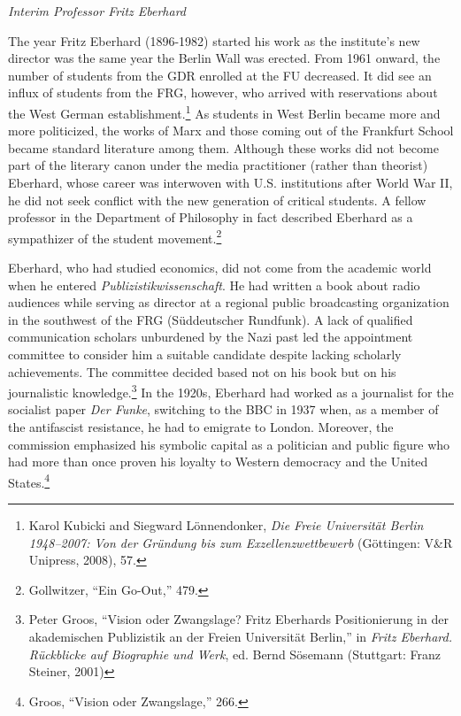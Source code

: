 \documentclass{tufte-handout}
\begin{document}
\vspace*{0.75em} 

\begin{centering}

\noindent \emph{Interim Professor Fritz Eberhard}

\end{centering}


\vspace*{0.5em} 


\noindent The year Fritz Eberhard (1896-1982) started his work as the institute's
new director was the same year the Berlin Wall was erected. From 1961
onward, the number of students from the GDR enrolled at the FU
decreased. It did see an influx of students from the FRG, however, who
arrived with reservations about the West German
establishment.\footnote{Karol Kubicki and Siegward Lönnendonker,
  \emph{Die Freie Universität Berlin 1948--2007: Von der Gründung bis
  zum Exzellenzwettbewerb} (Göttingen: V\&R Unipress, 2008), 57.} As
students in West Berlin became more and more politicized, the works of
Marx and those coming out of the Frankfurt School became standard
literature among them. Although these works did not become part of the
literary canon under the media practitioner (rather than theorist)
Eberhard, whose career was interwoven with U.S. institutions after World
War II, he did not seek conflict with the new generation of critical
students. A fellow professor in the Department of Philosophy in fact
described Eberhard as a sympathizer of the student movement.\footnote{Gollwitzer,
  ``Ein Go-Out,'' 479.}

Eberhard, who had studied economics, did not come from the academic
world when he entered \emph{Publizistikwissenschaft}. He had written a
book about radio audiences while serving as director at a regional
public broadcasting organization in the southwest of the FRG
(Süddeutscher Rundfunk). A lack of qualified communication scholars
unburdened by the Nazi past led the appointment committee to consider
him a suitable candidate despite lacking scholarly achievements. The
committee decided based not on his book but on his journalistic
knowledge.\footnote{Peter Groos, ``Vision oder Zwangslage? Fritz
  Eberhards Positionierung in der akademischen Publizistik an der Freien
  Universität Berlin,'' in \emph{Fritz Eberhard. Rückblicke auf
  Biographie und Werk}, ed. Bernd Sösemann (Stuttgart: Franz Steiner,
  2001)} In the 1920s, Eberhard had worked as a journalist for the
socialist paper \emph{Der Funke}, switching to the BBC in 1937 when, as
a member of the antifascist resistance, he had to emigrate to London.
Moreover, the commission emphasized his symbolic capital as a politician
and public figure who had more than once proven his loyalty to Western
democracy and the United States.\footnote{Groos, ``Vision oder
  Zwangslage,'' 266.}
\end{document}
